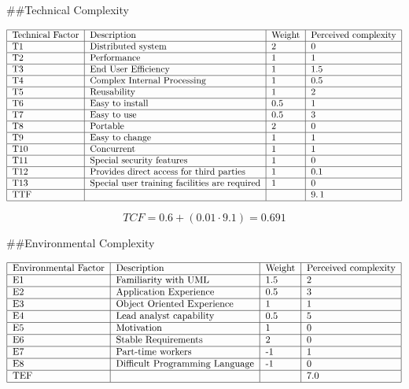 \documentclass{article}
\begin{document}
\#\#Technical Complexity

\[
\begin{tabular}{|l|l|l|l|}
\hline
Technical Factor & Description & Weight & Perceived complexity \\ \hline
T1 & Distributed system & 2 & 0 \\ \hline
T2 & Performance & 1 & 1 \\ \hline
T3 & End User Efficiency & 1 & 1.5 \\ \hline
T4 & Complex Internal Processing & 1 & 0.5 \\ \hline
T5 & Reusability & 1 & 2 \\ \hline
T6 & Easy to install & 0.5 & 1 \\ \hline
T7 & Easy to use & 0.5 & 3 \\ \hline
T8 & Portable & 2 & 0 \\ \hline
T9 & Easy to change & 1 & 1 \\ \hline
T10 & Concurrent & 1 & 1 \\ \hline
T11 & Special security features & 1 & 0 \\ \hline
T12 & Provides direct access for third parties & 1 & 0.1 \\ \hline
T13 & Special user training facilities are required & 1 & 0 \\ \hline
TTF &  &  & $9.\,\allowbreak 1$ \\ \hline
\end{tabular}%
\]

\[
TCF=0.6+\left( 0.01\cdot 9.1\right) =\allowbreak 0.691
\]%
$\,$

\#\#Environmental Complexity

\[
\begin{tabular}{|l|l|l|l|}
\hline
Environmental Factor & Description & Weight & Perceived complexity \\ \hline
E1 & Familiarity with UML & 1.5 & 2 \\ \hline
E2 & Application Experience & 0.5 & 3 \\ \hline
E3 & Object Oriented Experience & 1 & 1 \\ \hline
E4 & Lead analyst capability & 0.5 & 5 \\ \hline
E5 & Motivation & 1 & 0 \\ \hline
E6 & Stable Requirements & 2 & 0 \\ \hline
E7 & Part-time workers & -1 & 1 \\ \hline
E8 & Difficult Programming Language & -1 & 0 \\ \hline
TEF &  &  & $7.0$ \\ \hline
\end{tabular}%
\]
\end{document}
